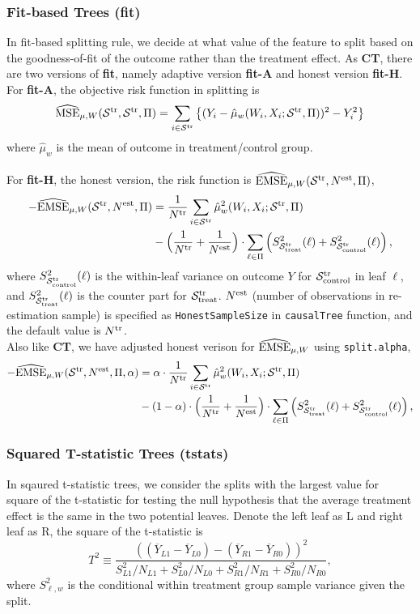 \documentclass[11pt]{article}
\newcommand{\emse}{{\rm EMSE}}
\newcommand{\est}{{\rm est}}
\newcommand{\calp}{{\Pi}}
\newcommand{\cals}{{\cal S}}
\newcommand{\mse}{{\rm MSE}}
\newcommand{\control}{{\rm control}}
\newcommand{\treat}{{\rm treat}}
\newcommand{\oy}{\overline{Y}}
\newcommand{\train}{{\rm tr}}
\begin{document}
\subsubsection{Fit-based Trees (\textbf{fit})}
In fit-based splitting rule, we decide at what value of the feature to split based on the goodness-of-fit of the outcome rather than the treatment effect. As \textbf{CT}, there are two versions of \textbf{fit}, namely adaptive version \textbf{fit-A} and honest version \textbf{fit-H}.\\
For \textbf{fit-A}, the objective risk function in splitting is 
\[\widehat{\mse}_{\mu, W}(\cals^\train,\cals^\train,\calp) =  \sum_{i\in\cals^\train} \left\{(Y_i-\hat\mu_w(W_i,X_i;\cals^\train,\calp))^2-Y^2_i\right\}\]
where $\hat\mu_w$ is the mean of outcome in treatment/control group.\\
\\
For \textbf{fit-H}, the honest version, the risk function is $\widehat{\emse}_{\mu, W}(\cals^\train, N^\est, \calp)$,
\begin{align*}
-\widehat{\emse}_{\mu, W}(\cals^\train, N^\est, \calp) & = 
\frac{1}{N^\train}\sum_{i\in\cals^\train} \hat\mu_w^2(W_i,X_i;\cals^\train,\calp) \\
& -
\Bigl(\frac{1}{N^\train} + \frac{1}{N^\est}\Bigr)\cdot \sum_{\ell\in\calp}
\left( S^2_{\cals^\train_\treat}(\ell)+ S^2_{\cals^\train_\control}(\ell)\right),
\end{align*}
where $S^2_{\cals^\train_\control}(\ell)$ is the within-leaf variance on outcome $Y$ for $\cals^\train_\control$ in leaf $\ell$, and $S^2_{\cals^\train_\treat}(\ell)$ is the counter part for $\cals^\train_\treat$. $N^\est$ (number of observations in re-estimation sample) is specified as \texttt{HonestSampleSize} in \texttt{causalTree} function, and the default value is $N^\train$.\\
Also like \textbf{CT}, we have adjusted honest verison for $\widehat{\emse}_{\mu, W}$ using \texttt{split.alpha},
\begin{align*}
-\widehat{\emse}_{\mu, W}(\cals^\train, N^\est,\calp, \alpha) & = 
\alpha \cdot \frac{1}{N^\train}\sum_{i\in\cals^\train} \hat\mu_w^2(W_i,X_i;\cals^\train,\calp) \\
& - (1 - \alpha) \cdot
\Bigl(\frac{1}{N^\train} + \frac{1}{N^\est}\Bigr)\cdot \sum_{\ell\in\calp}
\left( S^2_{\cals^\train_\treat}(\ell)+ S^2_{\cals^\train_\control}(\ell)\right),
\end{align*}

\subsubsection{Squared T-statistic Trees (\textbf{tstats})}
In sqaured t-statistic trees, we consider the splits with the largest value for square of the t-statistic for testing the null hypothesis that the average treatment effect is the same in the two potential leaves. Denote the left leaf as L and right leaf as R, the square of the t-statistic is 
\[ T^2 \equiv \frac{((\oy_{L1}-\oy_{L0})-
(\oy_{R1}-\oy_{R0})
)^2}{S_{L1}^2/N_{L1}+ S_{L0}^2/N_{L0}+S_{R1}^2/N_{R1}+S_{R0}^2/N_{R0}},\]
where $S_{\ell,w}^2$ is the conditional within treatment group sample variance given the split.
\end{document}
